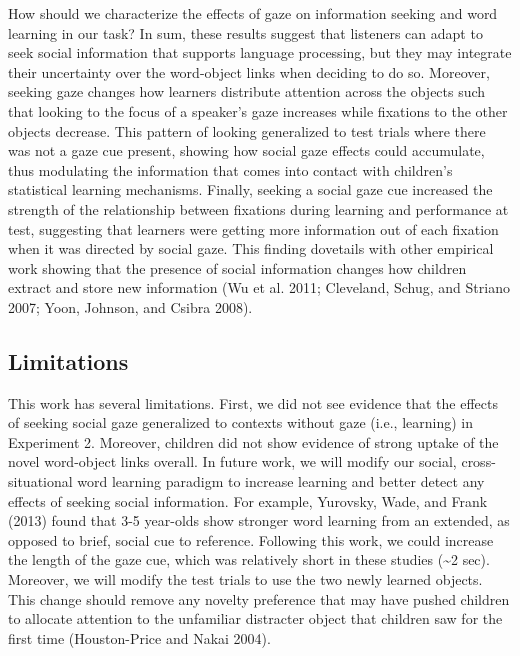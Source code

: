 \documentclass[10pt, letterpaper]{article}
\begin{document}
How should we characterize the effects of gaze on information seeking
and word learning in our task? In sum, these results suggest that
listeners can adapt to seek social information that supports language
processing, but they may integrate their uncertainty over the
word-object links when deciding to do so. Moreover, seeking gaze changes
how learners distribute attention across the objects such that looking
to the focus of a speaker's gaze increases while fixations to the other
objects decrease. This pattern of looking generalized to test trials
where there was not a gaze cue present, showing how social gaze effects
could accumulate, thus modulating the information that comes into
contact with children's statistical learning mechanisms. Finally,
seeking a social gaze cue increased the strength of the relationship
between fixations during learning and performance at test, suggesting
that learners were getting more information out of each fixation when it
was directed by social gaze. This finding dovetails with other empirical
work showing that the presence of social information changes how
children extract and store new information (Wu et al. 2011; Cleveland,
Schug, and Striano 2007; Yoon, Johnson, and Csibra 2008).

\hypertarget{limitations}{%
\subsection{Limitations}\label{limitations}}

This work has several limitations. First, we did not see evidence that
the effects of seeking social gaze generalized to contexts without gaze
(i.e., learning) in Experiment 2. Moreover, children did not show
evidence of strong uptake of the novel word-object links overall. In
future work, we will modify our social, cross-situational word learning
paradigm to increase learning and better detect any effects of seeking
social information. For example, Yurovsky, Wade, and Frank (2013) found
that 3-5 year-olds show stronger word learning from an extended, as
opposed to brief, social cue to reference. Following this work, we could
increase the length of the gaze cue, which was relatively short in these
studies (\textasciitilde{}2 sec). Moreover, we will modify the test
trials to use the two newly learned objects. This change should remove
any novelty preference that may have pushed children to allocate
attention to the unfamiliar distracter object that children saw for the
first time (Houston-Price and Nakai 2004).
\end{document}
